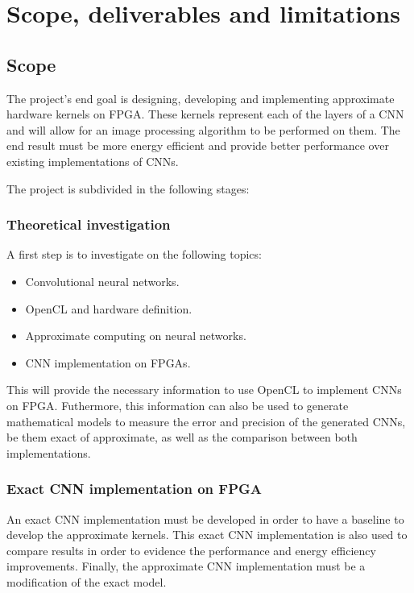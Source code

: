 \section{Scope, deliverables and limitations}

\subsection{Scope}

The project's end goal is designing, developing and implementing approximate hardware kernels on FPGA.
These kernels represent each of the layers of a CNN and will allow for an image processing algorithm to be
performed on them. The end result must be more energy efficient and provide better performance over existing
implementations of CNNs.

The project is subdivided in the following stages:

\subsubsection{Theoretical investigation}

A first step is to investigate on the following topics:

\begin{itemize}
    \item Convolutional neural networks.
    \item OpenCL and hardware definition.
    \item Approximate computing on neural networks.
    \item CNN implementation on FPGAs.
\end{itemize}

This will provide the necessary information to use OpenCL to implement CNNs on FPGA.
Futhermore, this information can also be used to generate mathematical models to measure the error
and precision of the generated CNNs, be them exact of approximate, as well as the comparison between
both implementations.

\subsubsection{Exact CNN implementation on FPGA}

An exact CNN implementation must be developed in order to have a baseline
to develop the approximate kernels. This exact CNN implementation is also used to
compare results in order to evidence the performance and energy efficiency improvements.
Finally, the approximate CNN implementation must be a modification of the exact model.

